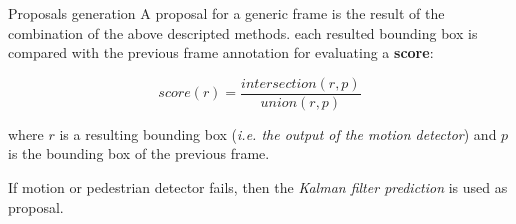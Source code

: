 \documentclass{beamer}
\begin{document}
\begin{tframe}{Proposals generation}
A proposal for a generic frame is the result of the combination of the above descripted methods. each resulted bounding box is compared with the previous frame annotation for evaluating a \textbf{score}:
\vspace{0.2cm}

$$score(r) = \frac{intersection(r, p)}{union(r, p)}$$

\vspace{0.3cm}

where $r$ is a resulting bounding box (\emph{i.e. the output of the motion detector}) and $p$ is the bounding box of the previous frame. 

\vspace{0.3cm}

If motion or pedestrian detector fails, then the \emph{Kalman filter prediction} is used as proposal.
\end{tframe}
\end{document}
